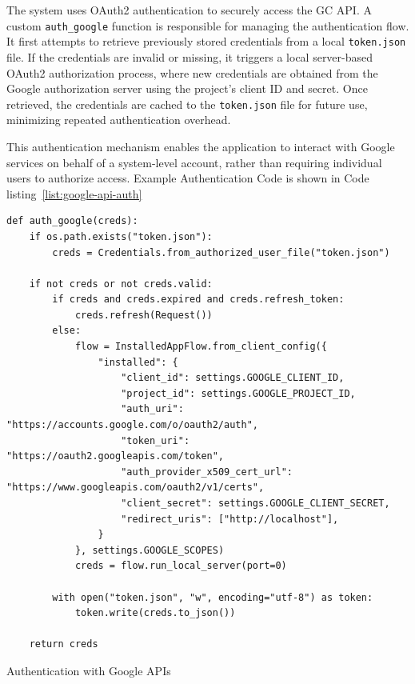 The system uses OAuth2 authentication to securely access the GC API. A custom \texttt{auth\_google} function is responsible for managing the authentication flow. It first attempts to retrieve previously stored credentials from a local \texttt{token.json} file. If the credentials are invalid or missing, it triggers a local server-based OAuth2 authorization process, where new credentials are obtained from the Google authorization server using the project’s client ID and secret. Once retrieved, the credentials are cached to the \texttt{token.json} file for future use, minimizing repeated authentication overhead.

This authentication mechanism enables the application to interact with Google services on behalf of a system-level account, rather than requiring individual users to authorize access. Example Authentication Code is shown in Code listing~\ref{list:google-api-auth}


\begin{listing}[t]
  \begin{verbatim}
def auth_google(creds):
    if os.path.exists("token.json"):
        creds = Credentials.from_authorized_user_file("token.json")

    if not creds or not creds.valid:
        if creds and creds.expired and creds.refresh_token:
            creds.refresh(Request())
        else:
            flow = InstalledAppFlow.from_client_config({
                "installed": {
                    "client_id": settings.GOOGLE_CLIENT_ID,
                    "project_id": settings.GOOGLE_PROJECT_ID,
                    "auth_uri": "https://accounts.google.com/o/oauth2/auth",
                    "token_uri": "https://oauth2.googleapis.com/token",
                    "auth_provider_x509_cert_url": "https://www.googleapis.com/oauth2/v1/certs",
                    "client_secret": settings.GOOGLE_CLIENT_SECRET,
                    "redirect_uris": ["http://localhost"],
                }
            }, settings.GOOGLE_SCOPES)
            creds = flow.run_local_server(port=0)

        with open("token.json", "w", encoding="utf-8") as token:
            token.write(creds.to_json())

    return creds
\end{verbatim}
\caption{Authentication with Google APIs}
\label{list:google-api-auth}
\end{listing}

